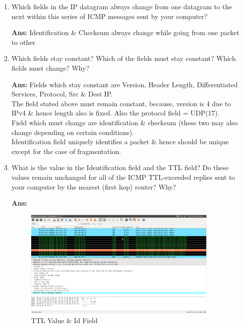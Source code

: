 \documentclass[a4,11pt]{article}
\newenvironment{que}
{ \color{ForestGreen}
  \begin{question}
}
{ \end{question} }
\newenvironment{sol}
{ \color{Black}
  \begin{solution}
}
{ \end{solution} }
\begin{document}
\begin{enumerate}
  \item 
  \begin{que}
   Which fields in the IP datagram always change from one datagram to the next within this series of ICMP messages sent by your computer?
  \end{que}

  \begin{sol}
    \textbf{Ans:} Identification \& Checksum always change while going from one packet to other \\
  \end{sol}
  
  \item
  \begin{que}
    Which fields stay constant? Which of the fields must stay constant? Which fields must change? Why?
  \end{que}

  \begin{sol}
   \textbf{Ans:} 
	Fields which stay constant are Version, Header Length, Differentiated Services, Protocol, Src \& Dest IP. \\
	The field stated above must remain constant, because, version is 4 due to IPv4 \& hence length also is fixed.
	Also the protocol field =  UDP(17). \\
	Field which must change are identification \& checksum (these two may also change depending on certain conditions). \\
	Identification field uniquely identifies a packet \& hence should be unique except for the case of fragmentation.
  \end{sol}

  
  \item
  \begin{que}
   What is the value in the Identification field and the TTL field? 
   Do these values remain unchanged for all of the ICMP TTL-exceeded replies sent to your computer by the nearest (first hop) router? Why?
  \end{que}

  \begin{sol}
  \textbf{Ans:}  
  
   \begin{figure}[h!]
      \includegraphics[width=0.9\textwidth]{ttl-values.png}
          \caption{TTL Value \& Id Field}
          \label{TTL}
  \end{figure}
  

\end{sol}
\end{enumerate}
\end{document}
